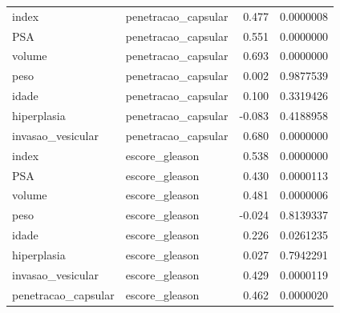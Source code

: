 \documentclass[runningheads]{llncs}\usepackage[]{graphicx}\usepackage[]{color}
\newenvironment{knitrout}{}{} %
\begin{document}
\begin{knitrout}
\begin{table}
\begin{tabular}[t]{llrr}
index & penetracao\_capsular & 0.477 & 0.0000008\\
\rowcolor{gray!6}  PSA & penetracao\_capsular & 0.551 & 0.0000000\\
volume & penetracao\_capsular & 0.693 & 0.0000000\\
\rowcolor{gray!6}  peso & penetracao\_capsular & 0.002 & 0.9877539\\
\addlinespace
idade & penetracao\_capsular & 0.100 & 0.3319426\\
\rowcolor{gray!6}  hiperplasia & penetracao\_capsular & -0.083 & 0.4188958\\
invasao\_vesicular & penetracao\_capsular & 0.680 & 0.0000000\\
\rowcolor{gray!6}  index & escore\_gleason & 0.538 & 0.0000000\\
PSA & escore\_gleason & 0.430 & 0.0000113\\
\addlinespace
\rowcolor{gray!6}  volume & escore\_gleason & 0.481 & 0.0000006\\
peso & escore\_gleason & -0.024 & 0.8139337\\
\rowcolor{gray!6}  idade & escore\_gleason & 0.226 & 0.0261235\\
hiperplasia & escore\_gleason & 0.027 & 0.7942291\\
\rowcolor{gray!6}  invasao\_vesicular & escore\_gleason & 0.429 & 0.0000119\\
\addlinespace
penetracao\_capsular & escore\_gleason & 0.462 & 0.0000020\\
\bottomrule
\end{tabular}
\end{table}


\end{knitrout}
\end{document}
